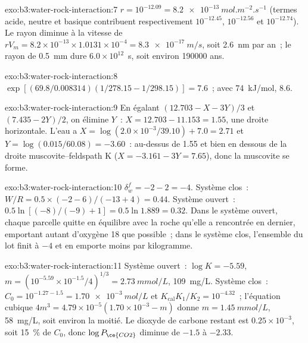 \begin{solution}{exo:b3:water-rock-interaction:7}
$r = 10^{-12.09} = \qty{8.2e-13}{mol.m^{-2}.s^{-1}}$ (termes acide, neutre et
basique contribuent respectivement $10^{-12.45}$, $10^{-12.56}$ et $10^{-12.74}$). Le
rayon diminue à la vitesse de $rV_m = 8.2\times10^{-13}\times1.0131\times10^{-4} =
\qty{8.3e-17}{m/s}$, soit \qty{2.6}{nm} par an~; le rayon de \qty{0.5}{mm} dure
$6.0\times10^{12}$~s, soit environ \num{190000} ans.
\end{solution}

\begin{solution}{exo:b3:water-rock-interaction:8}
$\exp[(69.8/0.008314)(1/278.15 - 1/298.15)] = 7.6$~; avec
\qty{74}{kJ/mol}, 8.6.
\end{solution}

\begin{solution}{exo:b3:water-rock-interaction:9}
En égalant $(12.703 - X - 3Y)/3$ et $(7.435 - 2Y)/2$, on élimine $Y$~: $X =
12.703 - 11.153 = 1.55$, une droite horizontale. L'eau a $X = \log(2.0\times
10^{-3}/39.10) + 7.0 = 2.71$ et $Y = \log(0.015/60.08) = -3.60$~: au-dessus de 1.55
et bien en dessous de la droite muscovite--feldspath K ($X = -3.161 - 3Y = 7.65$), donc
la muscovite se forme.
\end{solution}

\begin{solution}{exo:b3:water-rock-interaction:10}
$\delta_w^f = -2 - 2 = -4$. Système clos~: $W/R = 0.5\times(-2 - 6)/(-13 + 4) =
0.44$. Système ouvert~: $0.5\ln[(-8)/(-9) + 1] = 0.5\ln1.889 = 0.32$. Dans le système ouvert, chaque
parcelle quitte en équilibre avec la roche qu'elle a rencontrée en dernier, emportant autant
d'oxygène 18 que possible~; dans le système clos, l'ensemble du lot finit à $-4$ et
en emporte moins par kilogramme.
\end{solution}

\begin{solution}{exo:b3:water-rock-interaction:11}
Système ouvert~: $\log K = -5.59$, $m = (10^{-5.59}\times10^{-1.5}/4)^{1/3} =
\qty{2.73}{mmol/L}$, \qty{109}{mg/L}. Système clos~: $C_0 = 10^{-1.27 - 1.5} =
\qty{1.70e-3}{mol/L}$ et $K_{\mathrm{cal}}K_1/K_2 = 10^{-4.32}$~; l'équation cubique
$4m^3 = 4.79\times10^{-5}(1.70\times10^{-3} - m)$ donne $m =
\qty{1.45}{mmol/L}$, \qty{58}{mg/L}, soit environ la moitié. Le dioxyde de carbone restant est
$0.25\times10^{-3}$, soit \qty{15}{\percent} de $C_0$, donc $\log P_{\ce{CO2}}$ diminue
de $-1.5$ à $-2.33$.
\end{solution}


